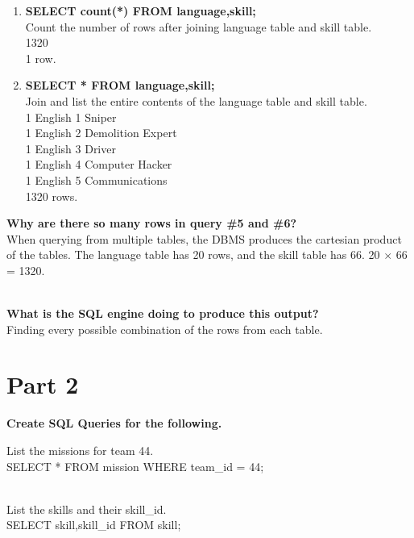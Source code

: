 \documentclass{article}
\begin{document}
\begin{enumerate}
\item
\textbf{SELECT count(*) FROM language,skill;\\}
\textsf{Count the number of rows after joining language table and skill table.\\
1320\\
1 row.\\}

\item
\textbf{SELECT * FROM language,skill;\\}
\textsf{Join and list the entire contents of the language table and skill table.\\
1 English 1 Sniper\\
1 English 2 Demolition Expert\\
1 English 3 Driver\\
1 English 4 Computer Hacker\\
1 English 5 Communications\\
1320 rows.\\}

\end{enumerate}

\textbf{Why are there so many rows in query \#5 and \#6?\\}
\textsf{When querying from multiple tables, the DBMS produces the cartesian product of the tables. 
The language table has 20 rows, and the skill table has 66. 20 $\times$ 66 = 1320.\\\\}

\textbf{What is the SQL engine doing to produce this output?\\}
\textsf{Finding every possible combination of the rows from each table.\\}

\pagebreak

\section*{Part 2}
\textbf{Create SQL Queries for the following.\\}

\textsf{List the missions for team 44.\\
SELECT * FROM mission WHERE team\_id = 44;\\\\}

\textsf{List the skills and their skill\_id.\\
SELECT skill,skill\_id FROM skill;\\\\}
\end{document}
